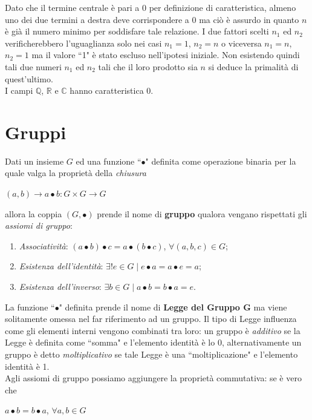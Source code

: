\documentclass[a4paper,12pt]{tesiinfo}
\begin{document}
Dato che il termine centrale \`e pari a 0 per definizione di caratteristica, almeno uno dei due termini a destra deve corrispondere a 0 ma ci\`o \`e assurdo in quanto $n$ \`e gi\`a il numero minimo per soddisfare tale relazione. I due fattori scelti $n_1$ ed $n_2$ verificherebbero l'uguaglianza solo nei casi $n_1=1$, $n_2=n$ o viceversa $n_1=n$, $n_2=1$ ma il valore ``1" \`e stato escluso nell'ipotesi iniziale. Non esistendo quindi tali due numeri $n_1$ ed $n_2$ tali che il loro prodotto sia $n$ si deduce la primalit\`a di quest'ultimo.
\\
I campi $\mathbb{Q}$, $\mathbb{R}$ e $\mathbb{C}$ hanno caratteristica $0$.
\section{Gruppi}
\label{base gruppi}
Dati un insieme $G$ ed una funzione ``$\bullet$" definita come operazione binaria per la quale valga la propriet\`a della \textit{chiusura}
\begin{center}
 $(a, b) \to a \bullet b : G \times G \to G$
\end{center}allora la coppia $(G, \bullet)$ prende il nome di \textbf{gruppo} qualora vengano rispettati gli \textit{assiomi di gruppo}:
\begin{enumerate}
 \item \textit{Associativit\`a}: $\left ( a\bullet b \right ) \bullet c = a \bullet \left ( b \bullet c \right ) $, $ \forall (a, b, c) \in G$;
 \item \textit{Esistenza dell'identit\`a}: $ \exists ! e \in G \mid e \bullet a = a \bullet e = a$;
 \item \textit{Esistenza dell'inverso}: $\exists b \in G \mid a \bullet b = b \bullet a = e$.
\end{enumerate} 
La funzione ``$\bullet$" definita prende il nome di \textbf{Legge del Gruppo G} ma viene solitamente omessa nel far riferimento ad un gruppo. Il tipo di Legge influenza come gli elementi interni vengono combinati tra loro: un gruppo \`e \textit{additivo} se la Legge \`e definita come ``somma" e l'elemento identit\`a \`e lo 0, alternativamente un gruppo \`e detto \textit{moltiplicativo} se tale Legge \`e una ``moltiplicazione" e l'elemento identit\`a \`e 1.\\
Agli assiomi di gruppo possiamo aggiungere la propriet\`a commutativa: se \`e vero che \begin{center}
 $ a \bullet b = b \bullet a$, $ \forall a, b \in G$
\end{center} 
\end{document}
